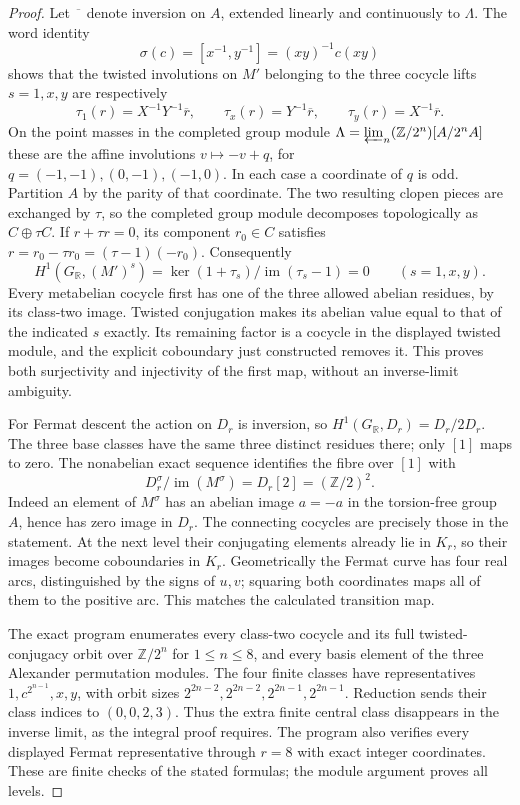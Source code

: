 \begin{proof}
Let $\overline{\phantom a}$ denote inversion on $A$,
extended linearly and continuously to $\Lambda$.
The word identity
\[
 \sigma(c)=[x^{-1},y^{-1}]
              =(xy)^{-1}c(xy)
\]
shows that the twisted involutions on $M'$ belonging
to the three cocycle lifts $s=1,x,y$ are respectively
\[
 \tau_1(r)=X^{-1}Y^{-1}\overline r,\qquad
 \tau_x(r)=Y^{-1}\overline r,\qquad
 \tau_y(r)=X^{-1}\overline r.
\]
On the point masses in the completed group module
$\Lambda=\varprojlim_n(\mathbb Z/2^n)[A/2^nA]$
these are the affine
involutions $v\mapsto-v+q$, for
$q=(-1,-1),(0,-1),(-1,0)$. In each case a coordinate
of $q$ is odd. Partition $A$ by the parity of that
coordinate. The two resulting clopen pieces are
exchanged by $\tau$, so the completed group module
decomposes topologically as $C\oplus\tau C$.
If $r+\tau r=0$, its component $r_0\in C$ satisfies
$r=r_0-\tau r_0=(\tau-1)(-r_0)$. Consequently
\[
 H^1(G_{\mathbb R},(M')^{s})
       =\ker(1+\tau_s)/\operatorname{im}(\tau_s-1)=0
                  \qquad(s=1,x,y).
\]
Every metabelian cocycle first has one of the three
allowed abelian residues, by its class-two image.
Twisted conjugation makes its abelian value equal
to that of the indicated $s$ exactly. Its remaining
factor is a cocycle in the displayed twisted module,
and the explicit coboundary just constructed removes
it. This proves both surjectivity and injectivity of
the first map, without an inverse-limit ambiguity.

For Fermat descent the action on $D_r$ is inversion,
so $H^1(G_{\mathbb R},D_r)=D_r/2D_r$.
The three base classes have the same three distinct
residues there; only $[1]$ maps to zero.
The nonabelian exact sequence identifies the fibre
over $[1]$ with
\[
 D_r^{\sigma}/\operatorname{im}(M^{\sigma})
   =D_r[2]=(\mathbb Z/2)^2.
\]
Indeed an element of $M^{\sigma}$ has an abelian
image $a=-a$ in the torsion-free group $A$, hence
has zero image in $D_r$. The connecting cocycles
are precisely those in the statement. At the next
level their conjugating elements already lie in
$K_r$, so their images become coboundaries in
$K_r$. Geometrically the Fermat curve has four real
arcs, distinguished by the signs of $u,v$; squaring
both coordinates maps all of them to the positive
arc. This matches the calculated transition map.

The exact program enumerates every class-two
cocycle and its full twisted-conjugacy orbit over
$\mathbb Z/2^n$ for $1\le n\le8$, and every basis
element of the three Alexander permutation modules.
The four finite classes have representatives
$1,c^{2^{n-1}},x,y$, with orbit sizes
$2^{2n-2},2^{2n-2},2^{2n-1},2^{2n-1}$.
Reduction sends their class indices to $(0,0,2,3)$.
Thus the extra finite central class disappears in
the inverse limit, as the integral proof requires.
The program also verifies every displayed Fermat
representative through $r=8$ with exact integer
coordinates. These are finite checks of the stated
formulas; the module argument proves all levels.
\end{proof}

